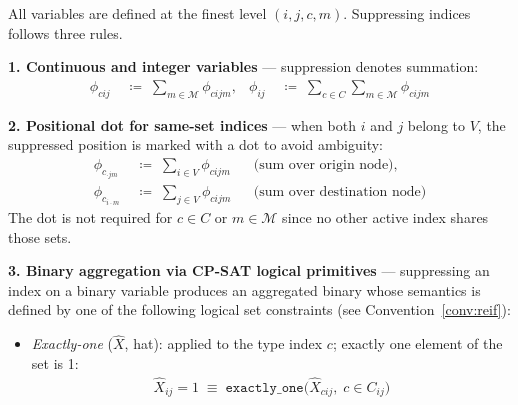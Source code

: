 \begin{convention}
\label{conv:notation}
All variables are defined at the finest level $(i,j,c,m)$.
Suppressing indices follows three rules.

\medskip
\noindent\textbf{1. Continuous and integer variables} ---
suppression denotes summation:
\begin{align*}
  \phi_{cij}
    &\;\coloneqq\; \sum_{m\in\mathcal{M}} \phi_{cijm},
  &
  \phi_{ij}
    &\;\coloneqq\;
      \sum_{c\in C}\sum_{m\in\mathcal{M}} \phi_{cijm}
\end{align*}

\medskip
\noindent\textbf{2. Positional dot for same-set indices} ---
when both $i$ and $j$ belong to $V$, the suppressed position is
marked with a dot to avoid ambiguity:
\begin{align*}
  \phi_{c}_{\cdot j m}
    &\;\coloneqq\; \sum_{i\in V} \phi_{cijm}
    &&\text{(sum over origin node)}, \\
  \phi_{c}_{i \cdot m}
    &\;\coloneqq\; \sum_{j\in V} \phi_{cijm}
    &&\text{(sum over destination node)}
\end{align*}
The dot is not required for $c \in C$ or $m \in \mathcal{M}$
since no other active index shares those sets.

\medskip
\noindent\textbf{3. Binary aggregation via CP-SAT logical
primitives} --- suppressing an index on a binary variable
produces an aggregated binary whose semantics is defined by one
of the following logical set constraints (see
Convention~\ref{conv:reif}):

\begin{itemize}
  \item \textit{Exactly-one} ($\hat{X}$, hat): applied to the
        type index $c$; exactly one element of the set is 1:
        \begin{align*}
          \hat{X}_{ij} = 1
            \;\equiv\;
            \texttt{exactly\_one}\bigl(\hat{X}_{cij},\;
            c \in C_{ij}\bigr)
        \end{align*}


\end{itemize}
\end{convention}
